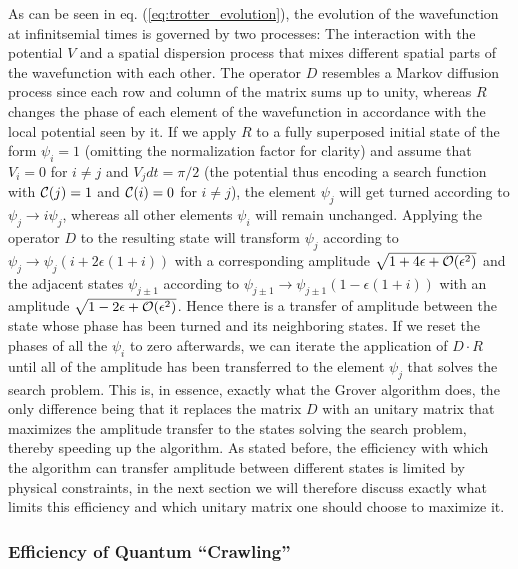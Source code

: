 \smallskip

As can be seen in eq. (\ref{eq:trotter_evolution}), the evolution of the wavefunction at infinitsemial times is governed by two processes: The interaction with the potential $V$ and a spatial dispersion process that mixes different spatial parts of the wavefunction with each other. The operator $D$ resembles a Markov diffusion process since each row and column of the matrix sums up to unity, whereas $R$ changes the phase of each element of the wavefunction in accordance with the local potential seen by it. If we apply $R$ to a fully superposed initial state of the form $\psi_i = 1$ (omitting the normalization factor for clarity) and assume that $V_i = 0$ for $i \ne j$ and $V_j dt = \pi/2$ (the potential thus encoding a search function with $\Or(j)=1$ and $\Or(i)=0$ for $i\ne j$), the element $\psi_j$ will get turned according to $\psi_j \to i\psi_j $, whereas all other elements $\psi_i$ will remain unchanged. Applying the operator $D$ to the resulting state will transform $\psi_j$ according to $\psi_j \to \psi_j(i+2\epsilon(1+i))$ with a corresponding amplitude $\sqrt{1+4\epsilon+\begin{mathcal}O\end{mathcal}(\epsilon^2)}$ and the adjacent states $\psi_{j\pm 1}$ according to $\psi_{j\pm 1} \to \psi_{j\pm 1}(1-\epsilon(1+i))$ with an amplitude $\sqrt{1-2\epsilon +\begin{mathcal}O\end{mathcal}(\epsilon^2)}$. Hence there is a transfer of amplitude between the state whose phase has been turned and its neighboring states. If we reset the phases of all the $\psi_i$ to zero afterwards, we can iterate the application of $D\cdot R$ until all of the amplitude has been transferred to the element $\psi_j$ that solves the search problem. This is, in essence, exactly what the Grover algorithm does, the only difference being that it replaces the matrix $D$ with an unitary matrix that maximizes the amplitude transfer to the states solving the search problem, thereby speeding up the algorithm. As stated before, the efficiency with which the algorithm can transfer amplitude between different states is limited by physical constraints, in the next section we will therefore discuss exactly what limits this efficiency and which unitary matrix one should choose to maximize it.

\subsubsection{Efficiency of Quantum ``Crawling''}

